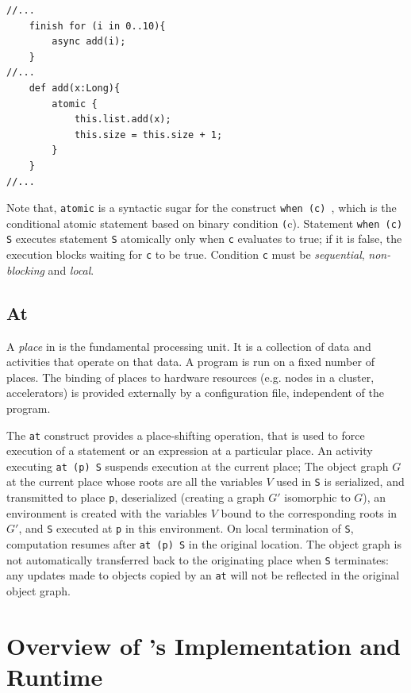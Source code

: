 \begin{lstlisting}[caption={Example use of \texttt{atomic}
construct},label={lst:x10Atomic},language=x10,numbers=none]
//...
	finish for (i in 0..10){
		async add(i);
	}
//...
	def add(x:Long){
		atomic {
			this.list.add(x);
			this.size = this.size + 1;
		}
	}
//...
\end{lstlisting}

Note that, \texttt{atomic} is a syntactic sugar for the construct \texttt{when
(c) }, which is the conditional atomic statement based on binary 
condition \texttt(c). Statement \texttt{when (c) S} executes statement
\texttt{S} atomically only when \texttt{c} evaluates to true; if it is false,
the execution blocks waiting for \texttt{c} to be true. Condition \texttt{c}
must be \emph{sequential}, \emph{non-blocking} and \emph{local}.

\subsection{At}\label{sec:places} A \emph{place} in \xten is the fundamental
processing unit. It is a collection of data and activities that operate on that
data. A program is run on a fixed number of places. The binding of places to
hardware resources (e.g. nodes in a cluster, accelerators) is provided
externally by a configuration file, independent of the program. 

The \texttt{at} construct provides a place-shifting operation, that is used to force
execution of a statement or an expression at a particular place. An activity
executing \texttt{at (p) S} suspends execution at the current place; The object
graph $G$ at the current place whose roots are all the variables $V$ used in
\texttt{S}
is serialized, and transmitted to place \texttt{p}, deserialized 
(creating a graph $G'$
isomorphic to $G$), an environment is created with the variables $V$ bound to
the corresponding roots in $G'$, and \texttt{S} executed at \texttt{p} in this 
environment. On
local termination of \texttt{S}, computation 
resumes after \texttt{at (p) S} in the original
location. The object graph is not automatically transferred back to the
originating place when \texttt{S} terminates: any updates made to 
objects copied by an \texttt{at}
will not be reflected in the original object graph. 

\section{Overview of \xten's Implementation and Runtime}


